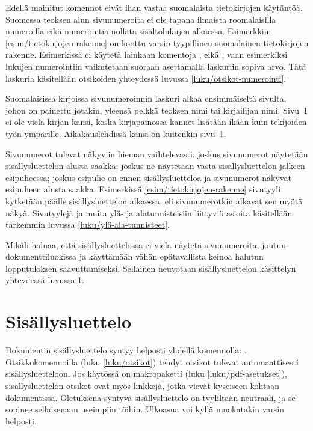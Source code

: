 Edellä mainitut komennot eivät ihan vastaa suomalaista tietokirjojen
käytäntöä. Suomessa teoksen alun sivunumeroita ei ole tapana ilmaista
roomalaisilla numeroilla eikä numerointia nollata sisältölukujen
alkaessa. Esimerkkiin \ref{esim/tietokirjojen-rakenne} on koottu varsin
tyypillinen suomalainen tietokirjojen rakenne. Esimerkissä ei käytetä
lainkaan komentoja ,  eikä
, vaan esimerkiksi lukujen numerointiin vaikutetaan
suoraan asettamalla laskuriin  sopiva arvo. Tätä
laskuria käsitellään otsikoiden yhteydessä luvussa
\ref{luku/otsikot-numerointi}.

Suomalaisissa kirjoissa sivunumeroinnin laskuri alkaa ensimmäiseltä
sivulta, johon on painettu jotakin, yleensä pelkkä teoksen nimi tai
kirjailijan nimi. Sivu~1 ei ole vielä kirjan kansi, koska kirjapainossa
kannet lisätään ikään kuin tekijöiden työn ympärille. Aikakauslehdissä
kansi on kuitenkin sivu~1.

Sivunumerot tulevat näkyviin hieman vaihtelevasti: joskus sivunumerot
näytetään sisällysluettelon alusta saakka; joskus ne näytetään vasta
sisällysluettelon jälkeen esipuheessa; joskus esipuhe on ennen
sisällysluetteloa ja sivunumerot näkyvät esipuheen alusta saakka.
Esimerkissä \ref{esim/tietokirjojen-rakenne} sivutyyli 
kytketään päälle sisällysluettelon alkaessa, eli sivunumerotkin alkavat
sen myötä näkyä. Sivutyylejä ja muita ylä- ja alatunnisteisiin liittyviä
asioita käsitellään tarkemmin luvussa \ref{luku/ylä-ala-tunnisteet}.

Mikäli haluaa, että sisällysluettelossa ei vielä näytetä sivunumeroita,
joutuu dokumenttiluokissa  ja  käyttämään
vähän epätavallista keinoa halutun lopputuloksen saavuttamiseksi.
Sellainen neuvotaan sisällysluettelon käsittelyn yhteydessä luvussa
\ref{luku/sisällysluettelo}.

\section{Sisällysluettelo}
\label{luku/sisällysluettelo}

Dokumentin sisällysluettelo syntyy helposti yhdellä komennolla:
. Otsikkokomennoilla (luku \ref{luku/otsikot})
tehdyt otsikot tulevat automaattisesti sisällysluetteloon. Jos käytössä
on makropaketti  (luku \ref{luku/pdf-asetukset}),
sisällysluettelon otsikot ovat myös linkkejä, jotka vievät kyseiseen
kohtaan dokumentissa. Oletuksena syntyvä sisällysluettelo on tyyliltään
neutraali, ja se sopinee sellaisenaan useimpiin töihin. Ulkoasua voi
kyllä muokatakin varsin helposti.

